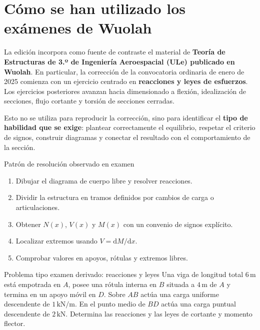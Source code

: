 
\chapter*{Cómo se han utilizado los exámenes de Wuolah}

La edición incorpora como fuente de contraste el material de \textbf{Teoría de Estructuras de 3.º de Ingeniería Aeroespacial (ULe) publicado en Wuolah}. En particular, la corrección de la convocatoria ordinaria de enero de 2025 comienza con un ejercicio centrado en \textbf{reacciones y leyes de esfuerzos}. Los ejercicios posteriores avanzan hacia dimensionado a flexión, idealización de secciones, flujo cortante y torsión de secciones cerradas.\autocite{wuolah-examen-2025}

Esto no se utiliza para reproducir la corrección, sino para identificar el \textbf{tipo de habilidad que se exige}: plantear correctamente el equilibrio, respetar el criterio de signos, construir diagramas y conectar el resultado con el comportamiento de la sección.

\begin{exambox}{Patrón de resolución observado en examen}
\begin{enumerate}
  \item Dibujar el diagrama de cuerpo libre y resolver reacciones.
  \item Dividir la estructura en tramos definidos por cambios de carga o articulaciones.
  \item Obtener $N(x)$, $V(x)$ y $M(x)$ con un convenio de signos explícito.
  \item Localizar extremos usando $V=\mathrm dM/\mathrm dx$.
  \item Comprobar valores en apoyos, rótulas y extremos libres.
\end{enumerate}
\end{exambox}

\begin{problembox}{Problema tipo examen derivado: reacciones y leyes}
Una viga de longitud total $6\,\mathrm m$ está empotrada en $A$, posee una rótula interna en $B$ situada a $4\,\mathrm m$ de $A$ y termina en un apoyo móvil en $D$. Sobre $AB$ actúa una carga uniforme descendente de $1\,\mathrm{kN/m}$. En el punto medio de $BD$ actúa una carga puntual descendente de $2\,\mathrm{kN}$. Determina las reacciones y las leyes de cortante y momento flector.
\end{problembox}

